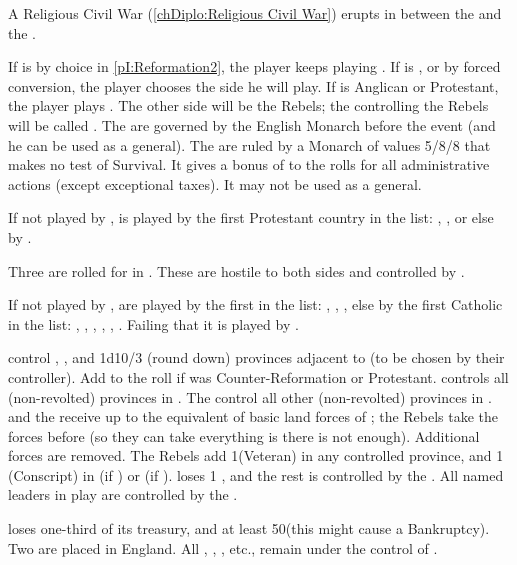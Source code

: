 \phevnt
\aparag A Religious Civil War (\ref{chDiplo:Religious Civil War}) erupts in
\ENG between the \parl and the \paysRoyalists.

\bparag If \ENG is \CATHCR by choice in \ref{pI:Reformation2}, the player
keeps playing \royal.
\bparag If \ENG is \CATHCO, or \CATHCR by forced conversion, the player
chooses the side he will play.
\bparag If \ENG is Anglican or Protestant, the player plays \parl.
\bparag The other side will be the Rebels; the \MAJ controlling the Rebels
will be called \REB.
\bparag\label{pIV:ECW:Monarchs} The \royal are governed by the English Monarch
before the event (and he can be used as a general). The \parl are ruled by a
Monarch  of values 5/8/8 that makes no test of Survival.
It gives a bonus of  to the rolls for all administrative actions
(except exceptional taxes). It may not be used as a general.

\aparag If not played by \ENG, \parl is played by the first Protestant country
in the list: \HOL, \FRA, \SUE or else by \POL.

\aparag Three \REVOLT are rolled for in \ENG. These \REVOLT are hostile to
both sides and controlled by \TUR.

\aparag If not played by \ENG, \royal are played by the first \CATHCR \MAJ in
the list: \SPA, \FRA, \HOL, \VEN else by the first Catholic \MAJ in the list:
\SPA, \FRA, \VEN, \SUE, \POR, \POL.  Failing that it is played by \RUS.

\bparag \royal control \provinceMidlands, \provinceCornwall, \provinceDurham
and 1d10/3 (round down) provinces adjacent to \provinceMidlands (to be chosen
by their controller). Add  to the roll if \ENG was
Counter-Reformation or Protestant. \royal controls all (non-revolted)
provinces in \regionIrlande.
\bparag The \parl control all other (non-revolted) provinces in \ENG.
\bparag \royal and the \parl receive up to the equivalent of basic land forces
of \ENG; the Rebels take the forces before (so they can take everything is
there is not enough). Additional forces are removed.
\bparag The Rebels add 1\LD (Veteran) in any controlled province, and 1\LD
(Conscript) in \provinceDurham (if \royal) or \provinceWessex (if \parl).
\bparag \ENG loses 1 \ND, and the rest is controlled by the \parl.
\bparag All named leaders in play are controlled by the \parl.

\bparag \ENG loses one-third of its treasury, and at least 50\ducats (this
might cause a Bankruptcy).
\bparag Two \PIRATE\faceplus are placed in \CTZ England.
\bparag All \TP, \COL, \TradeFLEET, etc., remain under the control of \ENG.

